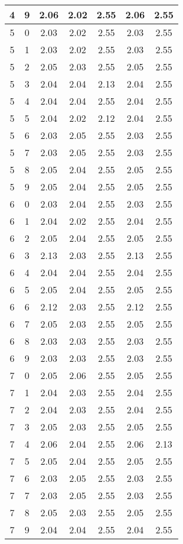 \begin{longtable}{|c|c||c||c|c||c|c|}
	4 & 9 & 2.06 & 2.02 & 2.55 & 2.06 & 2.55 \\ \hline
	5 & 0 & 2.03 & 2.02 & 2.55 & 2.03 & 2.55 \\ \hline
	5 & 1 & 2.03 & 2.02 & 2.55 & 2.03 & 2.55 \\ \hline
	5 & 2 & 2.05 & 2.03 & 2.55 & 2.05 & 2.55 \\ \hline
	5 & 3 & 2.04 & 2.04 & 2.13 & 2.04 & 2.55 \\ \hline
	5 & 4 & 2.04 & 2.04 & 2.55 & 2.04 & 2.55 \\ \hline
	5 & 5 & 2.04 & 2.02 & 2.12 & 2.04 & 2.55 \\ \hline
	5 & 6 & 2.03 & 2.05 & 2.55 & 2.03 & 2.55 \\ \hline
	5 & 7 & 2.03 & 2.05 & 2.55 & 2.03 & 2.55 \\ \hline
	5 & 8 & 2.05 & 2.04 & 2.55 & 2.05 & 2.55 \\ \hline
	5 & 9 & 2.05 & 2.04 & 2.55 & 2.05 & 2.55 \\ \hline
	6 & 0 & 2.03 & 2.04 & 2.55 & 2.03 & 2.55 \\ \hline
	6 & 1 & 2.04 & 2.02 & 2.55 & 2.04 & 2.55 \\ \hline
	6 & 2 & 2.05 & 2.04 & 2.55 & 2.05 & 2.55 \\ \hline
	6 & 3 & 2.13 & 2.03 & 2.55 & 2.13 & 2.55 \\ \hline
	6 & 4 & 2.04 & 2.04 & 2.55 & 2.04 & 2.55 \\ \hline
	6 & 5 & 2.05 & 2.04 & 2.55 & 2.05 & 2.55 \\ \hline
	6 & 6 & 2.12 & 2.03 & 2.55 & 2.12 & 2.55 \\ \hline
	6 & 7 & 2.05 & 2.03 & 2.55 & 2.05 & 2.55 \\ \hline
	6 & 8 & 2.03 & 2.03 & 2.55 & 2.03 & 2.55 \\ \hline
	6 & 9 & 2.03 & 2.03 & 2.55 & 2.03 & 2.55 \\ \hline
	7 & 0 & 2.05 & 2.06 & 2.55 & 2.05 & 2.55 \\ \hline
	7 & 1 & 2.04 & 2.03 & 2.55 & 2.04 & 2.55 \\ \hline
	7 & 2 & 2.04 & 2.03 & 2.55 & 2.04 & 2.55 \\ \hline
	7 & 3 & 2.05 & 2.03 & 2.55 & 2.05 & 2.55 \\ \hline
	7 & 4 & 2.06 & 2.04 & 2.55 & 2.06 & 2.13 \\ \hline
	7 & 5 & 2.05 & 2.04 & 2.55 & 2.05 & 2.55 \\ \hline
	7 & 6 & 2.03 & 2.05 & 2.55 & 2.03 & 2.55 \\ \hline
	7 & 7 & 2.03 & 2.05 & 2.55 & 2.03 & 2.55 \\ \hline
	7 & 8 & 2.05 & 2.03 & 2.55 & 2.05 & 2.55 \\ \hline
	7 & 9 & 2.04 & 2.04 & 2.55 & 2.04 & 2.55 \\ \hline
\end{longtable}
